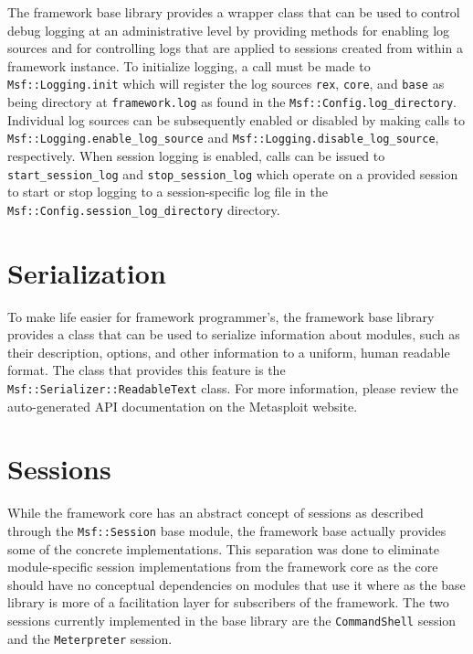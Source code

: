 \documentclass{report}
\begin{document}
\par
The framework base library provides a wrapper class that can be used
to control debug logging at an administrative level by providing
methods for enabling log sources and for controlling logs that are
applied to sessions created from within a framework instance.  To
initialize logging, a call must be made to
\texttt{Msf::Logging.init} which will register the log sources
\texttt{rex}, \texttt{core}, and \texttt{base} as being directory at
\texttt{framework.log} as found in the
\texttt{Msf::Config.log\_directory}.  Individual log sources can be
subsequently enabled or disabled by making calls to
\texttt{Msf::Logging.enable\_log\_source} and
\texttt{Msf::Logging.disable\_log\_source}, respectively.  When
session logging is enabled, calls can be issued to
\texttt{start\_session\_log} and \texttt{stop\_session\_log} which
operate on a provided session to start or stop logging to a
session-specific log file in the
\texttt{Msf::Config.session\_log\_directory} directory.

    \section{Serialization}

\par
To make life easier for framework programmer's, the framework base
library provides a class that can be used to serialize information
about modules, such as their description, options, and other
information to a uniform, human readable format.  The class that
provides this feature is the \texttt{Msf::Serializer::ReadableText}
class.  For more information, please review the auto-generated API
documentation on the Metasploit website.

    \section{Sessions}

\par
While the framework core has an abstract concept of sessions as
described through the \texttt{Msf::Session} base module, the
framework base actually provides some of the concrete
implementations.  This separation was done to eliminate
module-specific session implementations from the framework core as
the core should have no conceptual dependencies on modules that use
it where as the base library is more of a facilitation layer for
subscribers of the framework.  The two sessions currently
implemented in the base library are the \texttt{CommandShell}
session and the \texttt{Meterpreter} session.
\end{document}
